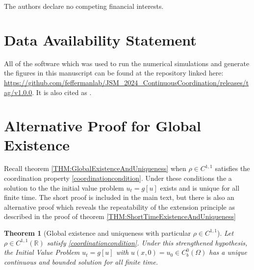 \documentclass[aps,
preprint,
groupedaddress,
showkeys,
amsmath]{revtex4-2}
\newtheorem{theorem*}{Theorem}
\begin{document}
The authors declare no competing financial interests.

\section{\label{DataAvail}Data Availability Statement}
All of the software which was used to run the numerical simulations and generate the figures in this manuscript can be found at the repository linked here: \url{https://github.com/feffermanlab/JSM_2024_ContinuousCoordination/releases/tag/v1.0.0}. It is also cited as \cite{McAlister2025}.

\appendix  
\section{Alternative Proof for Global Existence}\label{APP:AltProofForGlobalEx}
Recall theorem \ref{THM:GlobalExistenceAndUniqueness} when $\rho\in C^{1,1}$ satisfies the coordination property \eqref{coordinationcondition}. Under these conditions the a solution to the the initial value problem $u_t=g[u]$ exists and is unique for all finite time. The short proof is included in the main text, but there is also an alternative proof which reveals the repeatability of the extension principle as described in the proof of theorem \ref{THM:ShortTimeExistenceAndUniqueness}

    \begin{theorem*}[Global existence and uniqueness with particular $\rho\in C^{1,1}$]
        Let $\rho\in C^{1,1}(\mathbb{R})$ satisfy \eqref{coordinationcondition}. Under this strengthened hypothesis, the Initial Value Problem $u_t=g[u]$ with $u(x,0)=u_0\in C_b^0(\Omega)$ has a unique continuous and bounded solution for all finite time.
    \end{theorem*}
\end{document}
